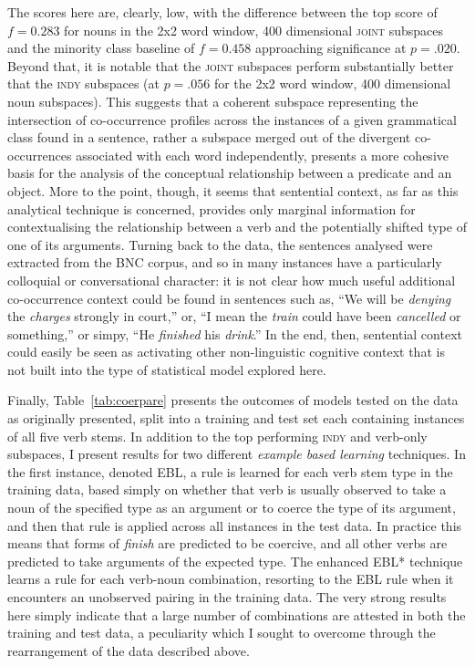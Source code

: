 The scores here are, clearly, low, with the difference between the top score of $f = 0.283$ for nouns in the 2x2 word window, 400 dimensional \textsc{joint} subspaces and the minority class baseline of $f = 0.458$ approaching significance at $p = .020$.  Beyond that, it is notable that the \textsc{joint} subspaces perform substantially better that the \textsc{indy} subspaces (at $p = .056$ for the 2x2 word window, 400 dimensional noun subspaces).  This suggests that a coherent subspace representing the intersection of co-occurrence profiles across the instances of a given grammatical class found in a sentence, rather a subspace merged out of the divergent co-occurrences associated with each word independently, presents a more cohesive basis for the analysis of the conceptual relationship between a predicate and an object.  More to the point, though, it seems that sentential context, as far as this analytical technique is concerned, provides only marginal information for contextualising the relationship between a verb and the potentially shifted type of one of its arguments.  Turning back to the data, the sentences analysed were extracted from the BNC corpus, and so in many instances have a particularly colloquial or conversational character: it is not clear how much useful additional co-occurrence context could be found in sentences such as, ``We will be \emph{denying} the \emph{charges} strongly in court,'' or, ``I mean the \emph{train} could have been \emph{cancelled} or something,'' or simpy, ``He \emph{finished} his \emph{drink}.''  In the end, then, sentential context could easily be seen as activating other non-linguistic cognitive context that is not built into the type of statistical model explored here.

Finally, Table~\ref{tab:coerpare} presents the outcomes of models tested on the data as originally presented, split into a training and test set each containing instances of all five verb stems.  In addition to the top performing \textsc{indy} and verb-only subspaces, I present results for two different \emph{example based learning} techniques.  In the first instance, denoted \textsc{EBL}, a rule is learned for each verb stem type in the training data, based simply on whether that verb is usually observed to take a noun of the specified type as an argument or to coerce the type of its argument, and then that rule is applied across all instances in the test data.  In practice this means that forms of \emph{finish} are predicted to be coercive, and all other verbs are predicted to take arguments of the expected type.  The enhanced \textsc{EBL*} technique learns a rule for each verb-noun combination, resorting to the \textsc{EBL} rule when it encounters an unobserved pairing in the training data.  The very strong results here simply indicate that a large number of combinations are attested in both the training and test data, a peculiarity which I sought to overcome through the rearrangement of the data described above.


